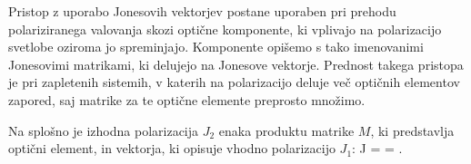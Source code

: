 Pristop z uporabo Jonesovih vektorjev postane uporaben pri prehodu
polariziranega valovanja skozi optične komponente, ki vplivajo na 
polarizacijo svetlobe oziroma jo spreminjajo. Komponente opišemo s tako
imenovanimi Jonesovimi matrikami, ki delujejo na Jonesove vektorje. 
Prednost takega pristopa je pri zapletenih sistemih, v katerih
na polarizacijo deluje več optičnih elementov zapored, saj
matrike za te optične elemente preprosto množimo.

Na splošno je izhodna polarizacija $J_2$ enaka produktu
matrike $M$, ki predstavlja optični element,
in vektorja, ki opisuje vhodno polarizacijo $J_1$:
\beq
J = \left[\begin{array}{c}
J_{2x}\\
J_{2y}\\
\end{array}\right] = 
\left[\begin{array}{cc}
M_{11}& M_{12}\\
M_{21}& M_{22}\\
\end{array}\right]\cdot
\left[\begin{array}{c}
J_{1x}\\
J_{1y}\\
\end{array}\right]\!\!.
\label{eq:03_48}
\eeq

